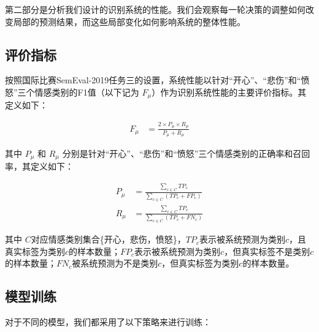 第二部分是分析我们设计的识别系统的性能。我们会观察每一轮决策的调整如何改变局部的预测结果，而这些局部变化如何影响系统的整体性能。

\subsection{评价指标}
\label{ssec:exp_context_emo_eval_metric}

按照国际比赛SemEval-2019任务三的设置，系统性能以针对“开心”、“悲伤”和“愤怒”三个情感类别的F1值（以下记为 $F_\mu$）作为识别系统性能的主要评价指标。其定义如下：

\begin{align}
  F_\mu &= \frac{2 \times P_\mu \times R_\mu}{P_\mu + R_\mu}
\end{align}

其中 $P_\mu$ 和 $R_\mu$ 分别是针对“开心”、“悲伤”和“愤怒”三个情感类别的正确率和召回率，其定义如下：

\begin{align}
  P_\mu &= \frac{\sum\limits_{c \in C} TP_c}{\sum\limits_{c \in C}(TP_c + FP_c)} \\
  R_\mu &= \frac{\sum\limits_{c \in C} TP_c}{\sum\limits_{c \in C}(TP_c + FN_c)}
\end{align}

其中 $C$对应情感类别集合\{开心，悲伤，愤怒\}，$TP_c$表示被系统预测为类别$c$，且真实标签为类别$c$的样本数量；$FP_c$表示被系统预测为类别$c$，但真实标签不是类别$c$的样本数量；$FN_c$被系统预测为不是类别$c$，但真实标签为类别$c$的样本数量。 



\subsection{模型训练}
\label{ssec:exp_context_emo_model_training}

对于不同的模型，我们都采用了以下策略来进行训练：

